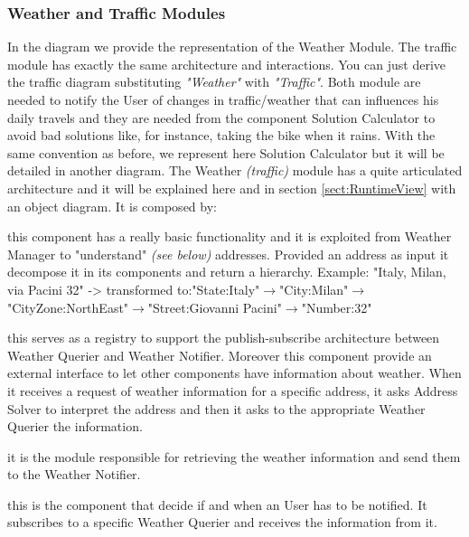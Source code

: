 	\filbreak
	\subsubsection{Weather and Traffic Modules}
		\label{sect:WeatherTrafficModules}
		In the diagram we provide the representation of the Weather Module. The traffic module has exactly the same architecture and interactions. You can just derive the traffic diagram substituting \textit{"Weather"} with \textit{"Traffic"}. Both module are needed to notify the User of changes in traffic/weather that can influences his daily travels and they are needed from the component Solution Calculator to avoid bad solutions like, for instance, taking the bike when it rains. With the same convention as before, we represent here Solution Calculator but it will be detailed in another diagram.\newline
		The Weather \textit{(traffic)} module has a quite articulated architecture and it will be explained here and in section \ref{sect:RuntimeView} with an object diagram.\newline
		It is composed by:
		\begin{description}[before={\renewcommand{\makelabel}[1]{-- \textit{##1}:}}]
			\item[Address Solver] this component has a really basic functionality and it is exploited from Weather Manager to "understand" \textit{(see below)} addresses. Provided an address as input it decompose it in its components and return a hierarchy.\newline
			Example: "Italy, Milan, via Pacini 32" -> transformed to:\newline "State:Italy"$\rightarrow$"City:Milan"$\rightarrow$"CityZone:NorthEast"$\rightarrow$"Street:Giovanni Pacini"$\rightarrow$"Number:32"
			\item[Weather Manager] this serves as a registry to support the publish-subscribe architecture between Weather Querier and Weather Notifier. Moreover this component provide an external interface to let other components have information about weather. When it receives a request of weather information for a specific address, it asks Address Solver to interpret the address and then it asks to the appropriate Weather Querier the information.
			\item[Weather Querier] it is the module responsible for retrieving the weather information and send them to the Weather Notifier.
			\item[Weather Notifier] this is the component that decide if and when an User has to be notified. It subscribes to a specific Weather Querier and receives the information from it. 
		\end{description}
